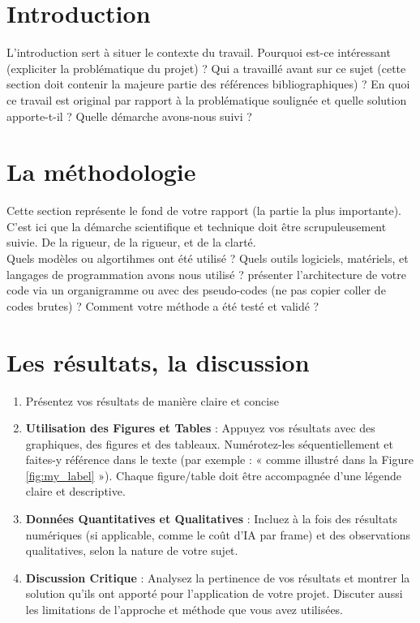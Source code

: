 \documentclass{rapportCS}
\begin{document}
\begingroup %
\color{blue}
\tabledematieres %
\endgroup




\section{Introduction} 

L'introduction sert à situer le contexte du travail. Pourquoi est-ce intéressant (expliciter la problématique du projet)  ? Qui a travaillé avant sur ce sujet (cette section doit contenir la majeure partie des références bibliographiques) ? En quoi ce travail est original par rapport à la problématique soulignée et quelle solution apporte-t-il ? Quelle
démarche avons-nous suivi ? 


\section{La méthodologie}
Cette section représente le fond de votre rapport (la partie la plus importante). C'est ici que la démarche scientifique et technique doit être scrupuleusement suivie. De la rigueur, de la rigueur, et de la clarté. \\
Quels modèles ou algortihmes ont été utilisé ? 
Quels outils logiciels, matériels, et langages de programmation avons nous utilisé ?
présenter l'architecture de votre code via un organigramme ou avec des pseudo-codes (ne pas copier coller de codes brutes) ? 
Comment votre méthode a été testé et validé ? 


\section{Les résultats, la discussion}
\begin{enumerate}
    \item Présentez vos résultats de manière claire et concise
    \item \textbf{Utilisation des Figures et Tables} : Appuyez vos résultats avec des graphiques, des figures et des tableaux. Numérotez-les séquentiellement et faites-y référence dans le texte (par exemple : « comme illustré dans la Figure \ref{fig:my_label} »). Chaque figure/table doit être accompagnée d’une légende claire et descriptive.
\item \textbf{Données Quantitatives et Qualitatives} : Incluez à la fois des résultats numériques (si applicable, comme le coût d'IA par frame) et des observations qualitatives, selon la nature de votre sujet.

\item \textbf{Discussion Critique} : Analysez la pertinence de vos résultats et montrer la solution qu'ils ont apporté pour l'application de votre projet. Discuter aussi les limitations de l'approche et méthode que vous avez utilisées.  

\end{enumerate}
\end{document}
